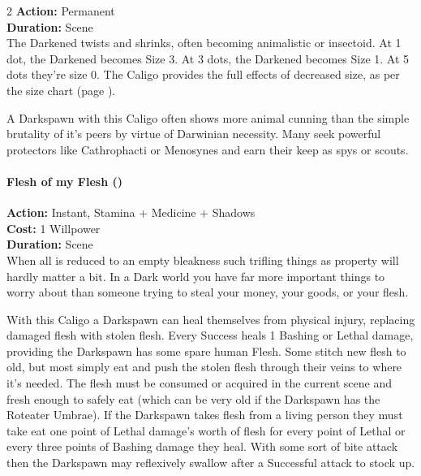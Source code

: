 \begin{multicols}{2}
\noindent \textbf{Action:} Permanent\\

\noindent \textbf{Duration:} Scene \\

\noindent The Darkened twists and shrinks, often becoming animalistic or insectoid. At 1 dot, the Darkened becomes Size 3. At 3 dots, the Darkened becomes Size 1. At 5 dots they're size 0. The Caligo provides the full effects of decreased size, as per the size chart (page \pageref{SizeTable}).

A Darkspawn with this Caligo often shows more animal cunning than the simple brutality of it's peers by virtue of Darwinian necessity. Many seek powerful protectors like Cathrophacti or Menosynes and earn their keep as spys or scouts. \\

\paragraph*{Flesh of my Flesh (\textbullet\textbullet\textbullet)}

\noindent \textbf{Action:} Instant, Stamina + Medicine + Shadows\\

\noindent \textbf{Cost:} 1 Willpower\\

\noindent \textbf{Duration:} Scene \\

\noindent When all is reduced to an empty bleakness such trifling things as property will hardly matter a bit. In a Dark world you have far more important things to worry about than someone trying to steal your money, your goods, or your flesh.

With this Caligo a Darkspawn can heal themselves from physical injury, replacing damaged flesh with stolen flesh. Every Success heals 1 Bashing or Lethal damage, providing the Darkspawn has some spare human Flesh. Some stitch new flesh to old, but most simply eat and push the stolen flesh through their veins to where it's needed. The flesh must be consumed or acquired in the current scene and fresh enough to safely eat (which can be very old if the Darkspawn has the Roteater Umbrae). If the Darkspawn takes flesh from a living person they must take eat one point of Lethal damage's worth of flesh for every point of Lethal or every three points of Bashing damage they heal. With some sort of bite attack then the Darkspawn may reflexively swallow after a Successful attack to stock up.\\


\end{multicols}
